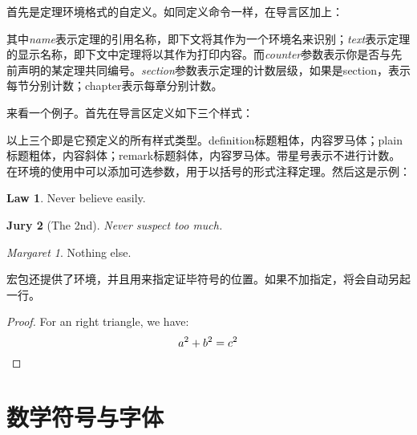 首先是定理环境格式的自定义。如同定义命令一样，在导言区加上：
\begin{latex}
\newtheorem{envname}[counter]{text}[section]
\end{latex}

其中\textit{name}表示定理的引用名称，即下文将其作为一个环境名来识别；\textit{text}表示定理的显示名称，即下文中定理将以其作为打印内容。而\textit{counter}参数表示你是否与先前声明的某定理共同编号。\textit{section}参数表示定理的计数层级，如果是section，表示每节分别计数；chapter表示每章分别计数。

来看一个例子。首先在导言区定义如下三个样式：
\begin{latex}
\theoremstyle{definition}\newtheorem{laws}{Law}[section]
\theoremstyle{plain}\newtheorem{ju}[laws]{Jury}
\theoremstyle{remark}\newtheorem*{marg}{Margaret}
\end{latex}

以上三个即是它预定义的所有样式类型。definition标题粗体，内容罗马体；plain标题粗体，内容斜体；remark标题斜体，内容罗马体。带星号表示不进行计数。在环境的使用中可以添加可选参数，用于以括号的形式注释定理。然后这是示例：

\begin{codeshow}
\begin{laws}
Never believe easily.
\end{laws}
\begin{ju}[The 2nd]
Never suspect too much.
\end{ju}
\begin{marg}
Nothing else.
\end{marg}
\end{codeshow}

宏包还提供了环境，并且用来指定证毕符号的位置。如果不加指定，将会自动另起一行。

\begin{codeshow}
\begin{proof}
For an right triangle, we have:
  \[a^2+b^2=c^2 \qedhere\]
\end{proof}
\end{codeshow}

\section{数学符号与字体}
